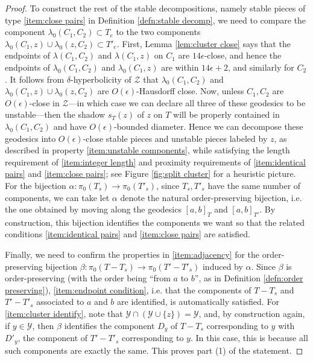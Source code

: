 \documentclass{amsart}
\theoremstyle{definition}
\theoremstyle{remark}
\theoremstyle{definition}
\newcommand{\calY}{\mathcal{Y}}
\newcommand{\calZ}{\mathcal{Z}}
\begin{document}
\begin{proof}
To construct the rest of the stable decompositions, namely stable pieces of type \eqref{item:close pairs} in Definition \ref{defn:stable decomp}, we need to compare the component $\lambda_0(C_1, C_2) \subset T_e$ to the two components $\lambda_0(C_1,z) \cup \lambda_0(z, C_2) \subset T'_e$.  First, Lemma \ref{lem:cluster close} says that the endpoints of $\lambda(C_1,C_2)$ and $\lambda(C_1,z)$ on $C_1$ are $14\epsilon$-close, and hence the endpoints of $\lambda_0(C_1,C_2)$ and $\lambda_0(C_1,z)$ are within $14\epsilon+2$, and similarly for $C_2$.  It follows from $\delta$-hyperbolicity of $\calZ$ that $\lambda_0(C_1, C_2)$ and $ \lambda_0(C_1,z) \cup \lambda_0(z, C_2)$ are $O(\epsilon)$-Hausdorff close.  Now, unless $C_1,C_2$ are $O(\epsilon)$-close in $\calZ$---in which case we can declare all three of these geodesics to be unstable---then the shadow $s_T(z)$ of $z$ on $T$ will be properly contained in $\lambda_0(C_1,C_2)$ and have $O(\epsilon)$-bounded diameter.    Hence we can decompose these geodesics into $O(\epsilon)$-close stable pieces and unstable pieces labeled by $z$, as described in property \eqref{item:unstable components}, while satisfying the length requirement of \eqref{item:integer length} and proximity requirements of \eqref{item:identical pairs} and \eqref{item:close pairs}; see Figure \ref{fig:split cluster} for a heuristic picture.  For the bijection $\alpha:\pi_0(T_s) \to \pi_0(T'_s)$, since $T_s,T'_s$ have the same number of components, we can take let $\alpha$ denote the natural order-preserving bijection, i.e. the one obtained by moving along the geodesics $[a,b]_{T}$ and $[a,b]_{T'}$.  By construction, this bijection identifies the components we want so that the related conditions \eqref{item:identical pairs} and \eqref{item:close pairs} are satisfied.

Finally, we need to confirm the properties in \eqref{item:adjacency} for the order-preserving bijection $\beta:\pi_0(T - T_s) \to \pi_0 (T'-T'_s)$ induced by $\alpha$.  Since $\beta$ is order-preserving (with the order being ``from $a$ to $b$'', as in Definition \ref{defn:order preserving}), \eqref{item:endpoint condition}, i.e. that the components of $T-T_s$ and $T' - T'_s$ associated to $a$ and $b$ are identified, is automatically satisfied.  For \eqref{item:cluster identify}, note that $\calY \cap (\calY \cup \{z\}) = \calY$, and, by construction again, if $y \in \calY$, then $\beta$ identifies the component $D_y$ of $T- T_s$ corresponding to $y$ with $D'_y$, the component of $T'-T'_s$ corresponding to $y$.  In this case, this is because all such components are exactly the same.   This proves part (1) of the statement.


\end{proof}
\end{document}
